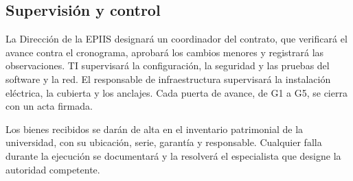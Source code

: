 \subsection{Supervisión y control}
La Dirección de la EPIIS designará un coordinador del contrato, que verificará el avance contra el cronograma, aprobará los cambios menores y registrará las observaciones. TI supervisará la configuración, la seguridad y las pruebas del software y la red. El responsable de infraestructura supervisará la instalación eléctrica, la cubierta y los anclajes. Cada puerta de avance, de G1 a G5, se cierra con un acta firmada.

Los bienes recibidos se darán de alta en el inventario patrimonial de la universidad, con su ubicación, serie, garantía y responsable. Cualquier falla durante la ejecución se documentará y la resolverá el especialista que designe la autoridad competente.

